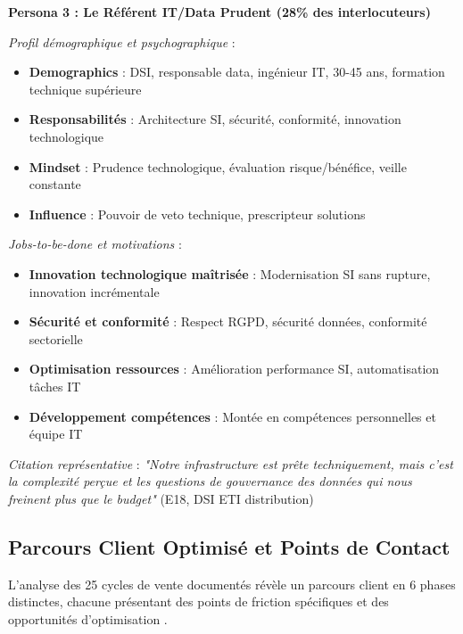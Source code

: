 \textbf{Persona 3 : Le Référent IT/Data Prudent (28\% des interlocuteurs)}

\emph{Profil démographique et psychographique} :
\begin{itemize}
    \item \textbf{Demographics} : DSI, responsable data, ingénieur IT, 30-45 ans, formation technique supérieure
    \item \textbf{Responsabilités} : Architecture SI, sécurité, conformité, innovation technologique
    \item \textbf{Mindset} : Prudence technologique, évaluation risque/bénéfice, veille constante
    \item \textbf{Influence} : Pouvoir de veto technique, prescripteur solutions
\end{itemize}

\emph{Jobs-to-be-done et motivations} :
\begin{itemize}
    \item \textbf{Innovation technologique maîtrisée} : Modernisation SI sans rupture, innovation incrémentale
    \item \textbf{Sécurité et conformité} : Respect RGPD, sécurité données, conformité sectorielle
    \item \textbf{Optimisation ressources} : Amélioration performance SI, automatisation tâches IT
    \item \textbf{Développement compétences} : Montée en compétences personnelles et équipe IT
\end{itemize}

\emph{Citation représentative} : \emph{"Notre infrastructure est prête techniquement, mais c'est la complexité perçue et les questions de gouvernance des données qui nous freinent plus que le budget"} (E18, DSI ETI distribution)

\subsection{Parcours Client Optimisé et Points de Contact}

L'analyse des 25 cycles de vente documentés révèle un parcours client en 6 phases distinctes, chacune présentant des points de friction spécifiques et des opportunités d'optimisation \cite{luwai2025journey}.

